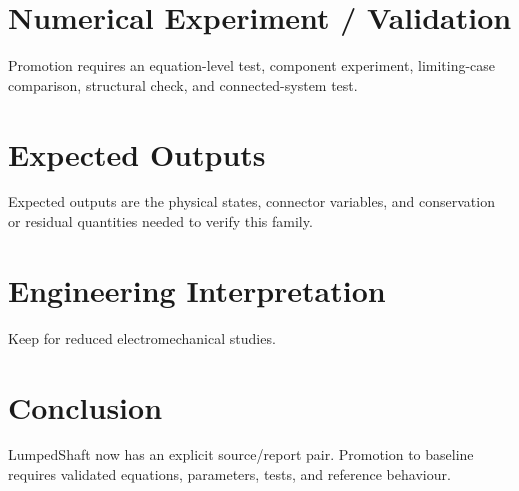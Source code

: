 \documentclass[10pt,a4paper]{article}
\begin{document}
\section{Numerical Experiment / Validation}Promotion requires an equation-level test, component experiment, limiting-case comparison, structural check, and connected-system test.
\section{Expected Outputs}Expected outputs are the physical states, connector variables, and conservation or residual quantities needed to verify this family.
\section{Engineering Interpretation}Keep for reduced electromechanical studies.
\section*{Conclusion}LumpedShaft now has an explicit source/report pair. Promotion to baseline requires validated equations, parameters, tests, and reference behaviour.
\end{document}
